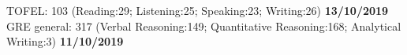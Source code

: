 
\begin{cventries}
  \cventry
    {} %
    {TOFEL: 103 (Reading:29; Listening:25; Speaking:23; Writing:26)} %
    {\textcolor{awesome-emerald}{\textbf{13/10/2019}}} %
    {} %
    {}
  \vspace{-0.6cm}
  \cventry
    {}
    {GRE general: 317 (Verbal Reasoning:149; Quantitative Reasoning:168; Analytical Writing:3)}
    {\textcolor{awesome-emerald}{\textbf{11/10/2019}}}
    {}
    {}
  \vspace{-1.1cm}
\end{cventries}